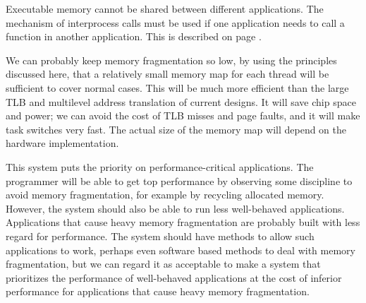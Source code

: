 \documentclass[forwardcom.tex]{subfiles}
\begin{document}
Executable memory cannot be shared between different applications. The mechanism of interprocess calls must be used if one application needs to call a function in another application. This is described on page \pageref{interProcessCalls}. 
\vspace{2mm}

We can probably keep memory fragmentation so low, by using the principles discussed here, that a relatively small memory map for each thread will be sufficient to cover normal cases. This will be much more efficient than the large TLB and multilevel address translation of current designs. It will save chip space and power; we can avoid the cost of TLB misses and page faults, and it will make task switches very fast. The actual size of the memory map will depend on the hardware implementation.
\vspace{2mm}

This system puts the priority on performance-critical applications. The programmer will be able to get top performance by observing some discipline to avoid memory fragmentation, for example by recycling allocated memory. However, the system should also be able to run less well-behaved applications. Applications that cause heavy memory fragmentation are probably built with less regard for performance. The system should have methods to allow such applications to work, perhaps even software based methods to deal with memory fragmentation, but we can regard it as acceptable to make a system that prioritizes the performance of well-behaved applications at the cost of inferior performance for applications that cause heavy memory fragmentation.
\end{document}
